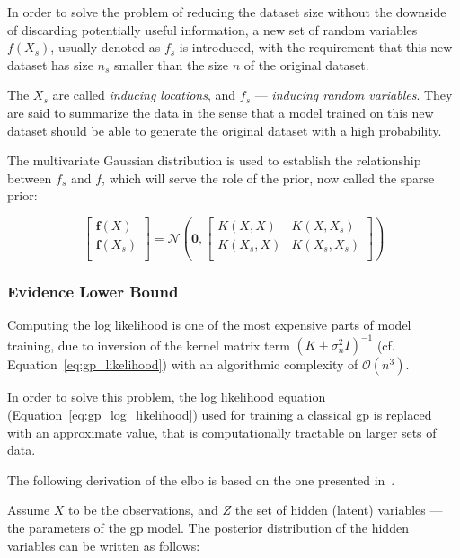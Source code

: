 In order to solve the problem of reducing the dataset size without the downside
of discarding potentially useful information, a new set of random variables
$f(X_s)$, usually denoted as $f_s$ is introduced, with the requirement that this
new dataset has size $n_s$  smaller than the size $n$ of the original dataset. 

The $X_s$ are called \textit{inducing locations}, and $f_s$ --- \textit{inducing
random variables}. They are said to summarize the data in the sense that a model
trained on this new dataset should be able to generate the original dataset with
a high probability.

The multivariate Gaussian distribution is used to establish the relationship
between $f_s$ and $f$, which will serve the role of the prior, now called the
sparse prior:

\begin{equation}
    \begin{bmatrix}
        \mathbf{f}(X) \\
        \mathbf{f}(X_s) \\
    \end{bmatrix} = 
    \mathcal{N}\left(
        \mathbf{0}, 
        \begin{bmatrix}
            K(X, X) & K(X, X_s) \\
            K(X_s, X) & K(X_s, X_s) \\
        \end{bmatrix}
    \right)
\end{equation}

\subsubsection{Evidence Lower Bound}

Computing the log likelihood is one of the most expensive parts of model
training, due to inversion of the kernel matrix term ${\left(K +
\sigma_n^2I\right)}^{-1}$ (cf. Equation~\ref{eq:gp_likelihood}) with an
algorithmic complexity of $\mathcal{O}(n^3)$.

In order to solve this problem, the log likelihood equation
(Equation~\ref{eq:gp_log_likelihood}) used for training a
classical \acrshort{gp} is replaced with an approximate value, that is
computationally tractable on larger sets of data.

The following derivation of the \acrshort{elbo} is based on the one presented
in~\cite{yangUnderstandingVariationalLower}.

Assume $X$ to be the observations, and $Z$ the set of hidden (latent)
variables --- the parameters of the \acrshort{gp} model. The posterior
distribution of the hidden variables can be written as follows:

